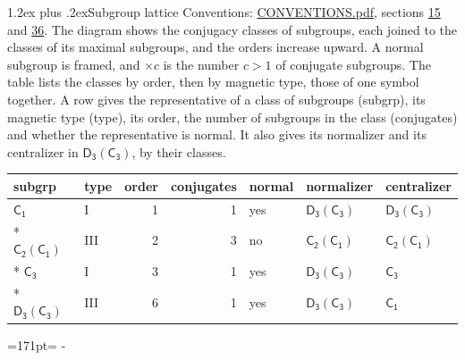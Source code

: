 \documentclass[10pt,a4paper]{article}
\makeatletter
\renewcommand\section{\@startsection{section}{1}{\z@}{-3ex plus -1ex minus -.2ex}%
  {1.2ex plus .2ex}{\normalfont\large\sffamily\bfseries\color{parttitle}}}
\newcommand{\needspace}[1]{\par\penalty-100\begingroup\dimen0=#1\relax\dimen2=\pagegoal
  \advance\dimen2-\pagetotal\ifdim\dimen0>\dimen2\relax\ifdim\dimen2>0pt\vfil\break\fi\fi
  \endgroup}
\numberwithin{equation}{section}
\newcommand{\grp}[1]{\mathsf{#1}}
\newcommand{\nconj}[1]{{\scriptsize$\times#1$}}
\makeatother
\begin{document}
\section{Subgroup lattice}\label{s:subgroups}
Conventions: \href{../../CONVENTIONS.pdf}{CONVENTIONS.pdf}, sections \href{../../../rotation/CONVENTIONS.pdf\#conv.15}{15} and \href{../../CONVENTIONS.pdf\#conv.36}{36}.
The diagram shows the conjugacy classes of subgroups, each joined to the classes of its maximal subgroups, and the orders increase upward. \label{n:index.conjugates.c}\label{n:mark.conjugates}A normal subgroup is framed, and ${\times}c$ is the number $c > 1$ of conjugate subgroups. The table lists the classes by order, then by magnetic type, those of one symbol together. \label{n:head.subgroup}\label{n:head.magnetic.type}\label{n:head.order}\label{n:head.conjugates}\label{n:head.normal}A row gives the representative of a class of subgroups (subgrp), its magnetic type (type), its order, the number of subgroups in the class (conjugates) and whether the representative is normal. \label{n:head.normalizer}\label{n:head.centralizer}It also gives its normalizer and its centralizer in $\grp{D_{3}}(\grp{C_{3}})$, by their classes. 
\begin{center}
\end{center}
{\small\begin{longtable}{@{}llrrlll@{}}\toprule
subgrp & type & order & conjugates & normal & normalizer & centralizer\\\midrule\endhead
\bottomrule\endfoot\endlastfoot
\href{../../../rotation/data/pdf/C1.pdf}{$\grp{C_{1}}$} & I & 1 & 1 & yes & \href{D3-C3.pdf}{$\grp{D_{3}}(\grp{C_{3}})$} & \href{D3-C3.pdf}{$\grp{D_{3}}(\grp{C_{3}})$}\\*
\href{C2-C1.pdf}{$\grp{C_{2}}(\grp{C_{1}})$} & III & 2 & 3 & no & \href{C2-C1.pdf}{$\grp{C_{2}}(\grp{C_{1}})$} & \href{C2-C1.pdf}{$\grp{C_{2}}(\grp{C_{1}})$}\\*
\href{../../../rotation/data/pdf/C3.pdf}{$\grp{C_{3}}$} & I & 3 & 1 & yes & \href{D3-C3.pdf}{$\grp{D_{3}}(\grp{C_{3}})$} & \href{../../../rotation/data/pdf/C3.pdf}{$\grp{C_{3}}$}\\*
\href{D3-C3.pdf}{$\grp{D_{3}}(\grp{C_{3}})$} & III & 6 & 1 & yes & \href{D3-C3.pdf}{$\grp{D_{3}}(\grp{C_{3}})$} & \href{../../../rotation/data/pdf/C1.pdf}{$\grp{C_{1}}$}\\
\bottomrule\end{longtable}}
\needspace{171pt}
\end{document}
